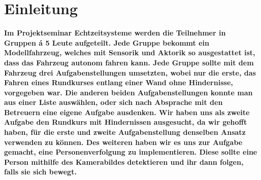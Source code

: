 \section{Einleitung}
\label{sec:einleitung}
\textbf{Im Projektseminar Echtzeitsysteme werden die Teilnehmer in Gruppen \'{a} 5 Leute aufgeteilt. Jede Gruppe bekommt ein Modellfahrzeug, welches mit Sensorik und Aktorik so ausgestattet ist, dass das Fahrzeug autonom fahren kann. Jede Gruppe sollte mit dem Fahrzeug drei Aufgabenstellungen umsetzten, wobei nur die erste, das Fahren eines Rundkurses entlang einer Wand ohne Hindernisse, vorgegeben war. Die anderen beiden Aufgabenstellungen konnte man aus einer Liste ausw\"ahlen, oder sich nach Absprache mit den Betreuern eine eigene Aufgabe ausdenken. Wir haben uns als zweite Aufgabe den Rundkurs mit Hindernissen ausgesucht, da wir gehofft haben, f\"ur die erste und zweite Aufgabenstellung denselben Ansatz verwenden zu k\"onnen. Des weiteren haben wir es uns zur Aufgabe gemacht, eine Personenverfolgung zu implementieren. Diese sollte eine Person mithilfe des Kamerabildes detektieren und ihr dann folgen, falls sie sich bewegt.}
